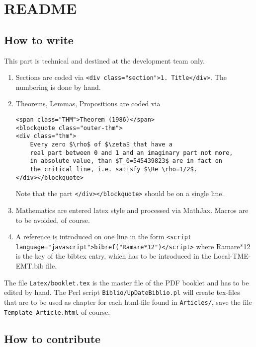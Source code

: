 \documentclass[10pt,twoside, svgnames]{book}
\begin{document}
\chapter{README}

\section{How to write}

This part is technical and destined at the development team only.

\begin{enumerate}
\item Sections are coded via \texttt{<div
    class="section">1. Title</div>}. The numbering is done by hand.
\item Theorems, Lemmas, Propositions are coded via
  \begin{verbatim}
<span class="THM">Theorem (1986)</span>
<blockquote class="outer-thm">
<div class="thm">
    Every zero $\rho$ of $\zeta$ that have a
    real part between 0 and 1 and an imaginary part not more, 
    in absolute value, than $T_0=545439823$ are in fact on
    the critical line, i.e. satisfy $\Re \rho=1/2$.
</div></blockquote> 
\end{verbatim}
Note that the part \verb|</div></blockquote>|
should be on a single line.
  
\item Mathematics are entered latex style and processed via MathJax. Macros are to be avoided, of course.
\item A reference is introduced on one line in the form \newline
\texttt{<script language="javascript">bibref("Ramare*12")</script>}
\newline
 where Ramare*12 is the key of the bibtex entry, which has to be
 introduced in the Local-TME-EMT.bib file.  
\end{enumerate}

The file \texttt{Latex/booklet.tex} is the master file of the PDF
booklet and has to be edited by hand. The Perl script
\texttt{Biblio/UpDateBiblio.pl} will create tex-files that are to be
used as chapter for each html-file found in \texttt{Articles/}, save
the file \texttt{Template\_Article.html} of course.


\section{How to contribute}
\end{document}
